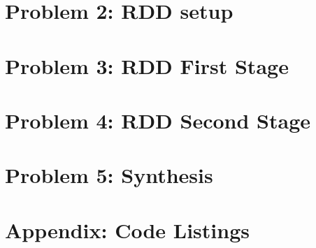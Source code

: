 \documentclass[letterpaper, 12pt]{article}
\begin{document}
\section{Problem 2: RDD setup}

\section{Problem 3: RDD First Stage}

\section{Problem 4: RDD Second Stage}

\section{Problem 5: Synthesis}

\section{Appendix: Code Listings}


\end{document}
